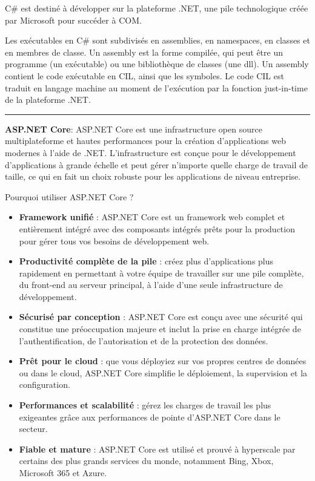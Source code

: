 \noindent C\# est destiné à développer sur la plateforme .NET, une pile technologique créée par Microsoft pour succéder à COM.

\noindent Les exécutables en C\# sont subdivisés en assemblies, en namespaces, en classes et en membres de classe. Un assembly est la forme compilée, qui peut être un programme (un exécutable) ou une bibliothèque de classes (une dll). Un assembly contient le code exécutable en CIL, ainsi que les symboles. Le code CIL est traduit en langage machine au moment de l'exécution par la fonction just-in-time de la plateforme .NET. 

\begin{center}
\rule{5cm}{0.4pt}
\end{center}

\vspace{0.5cm}

\noindent \textbf{ASP.NET Core}:
\noindent ASP.NET Core est une infrastructure open source multiplateforme et hautes performances pour la création d’applications web modernes à l’aide de .NET. L’infrastructure est conçue pour le développement d’applications à grande échelle et peut gérer n’importe quelle charge de travail de taille, ce qui en fait un choix robuste pour les applications de niveau entreprise.

\noindent Pourquoi utiliser ASP.NET Core ?
\begin{itemize}
	\item \textbf{Framework unifié} : ASP.NET Core est un framework web complet et entièrement intégré avec des composants intégrés prêts pour la production pour gérer tous vos besoins de développement web.
    \item \textbf{Productivité complète de la pile} : créez plus d’applications plus rapidement en permettant à votre équipe de travailler sur une pile complète, du front-end au serveur principal, à l’aide d’une seule infrastructure de développement.
    \newpage
	\item \textbf{Sécurisé par conception} : ASP.NET Core est conçu avec une sécurité qui constitue une préoccupation majeure et inclut la prise en charge intégrée de l’authentification, de l’autorisation et de la protection des données.
    \item \textbf{Prêt pour le cloud} : que vous déployiez sur vos propres centres de données ou dans le cloud, ASP.NET Core simplifie le déploiement, la supervision et la configuration.
    \item \textbf{Performances et scalabilité} : gérez les charges de travail les plus exigeantes grâce aux performances de pointe d'ASP.NET Core dans le secteur.
    \item \textbf{Fiable et mature} : ASP.NET Core est utilisé et prouvé à hyperscale par certains des plus grands services du monde, notamment Bing, Xbox, Microsoft 365 et Azure.
\end{itemize}

